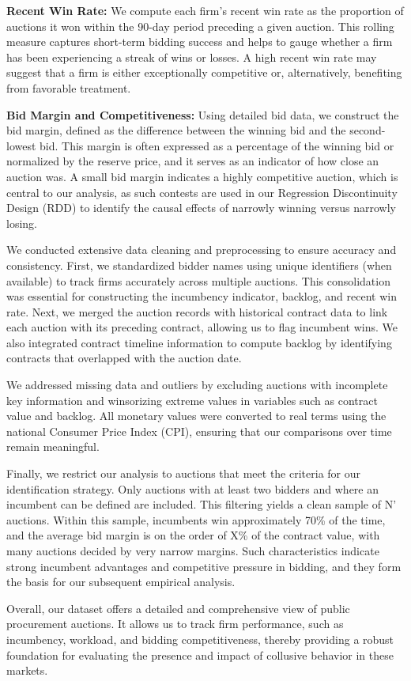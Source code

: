 \textbf{Recent Win Rate:} We compute each firm’s recent win rate as the proportion of auctions it won within the 90-day period preceding a given auction. This rolling measure captures short-term bidding success and helps to gauge whether a firm has been experiencing a streak of wins or losses. A high recent win rate may suggest that a firm is either exceptionally competitive or, alternatively, benefiting from favorable treatment.

\textbf{Bid Margin and Competitiveness:} Using detailed bid data, we construct the bid margin, defined as the difference between the winning bid and the second-lowest bid. This margin is often expressed as a percentage of the winning bid or normalized by the reserve price, and it serves as an indicator of how close an auction was. A small bid margin indicates a highly competitive auction, which is central to our analysis, as such contests are used in our Regression Discontinuity Design (RDD) to identify the causal effects of narrowly winning versus narrowly losing.

\medskip

We conducted extensive data cleaning and preprocessing to ensure accuracy and consistency. First, we standardized bidder names using unique identifiers (when available) to track firms accurately across multiple auctions. This consolidation was essential for constructing the incumbency indicator, backlog, and recent win rate. Next, we merged the auction records with historical contract data to link each auction with its preceding contract, allowing us to flag incumbent wins. We also integrated contract timeline information to compute backlog by identifying contracts that overlapped with the auction date.

We addressed missing data and outliers by excluding auctions with incomplete key information and winsorizing extreme values in variables such as contract value and backlog. All monetary values were converted to real terms using the national Consumer Price Index (CPI), ensuring that our comparisons over time remain meaningful.

Finally, we restrict our analysis to auctions that meet the criteria for our identification strategy. Only auctions with at least two bidders and where an incumbent can be defined are included. This filtering yields a clean sample of N' auctions. Within this sample, incumbents win approximately 70\% of the time, and the average bid margin is on the order of X\% of the contract value, with many auctions decided by very narrow margins. Such characteristics indicate strong incumbent advantages and competitive pressure in bidding, and they form the basis for our subsequent empirical analysis.

Overall, our dataset offers a detailed and comprehensive view of public procurement auctions. It allows us to track firm performance, such as incumbency, workload, and bidding competitiveness, thereby providing a robust foundation for evaluating the presence and impact of collusive behavior in these markets.
